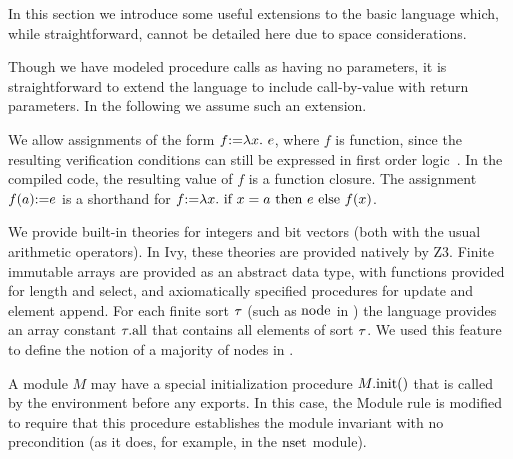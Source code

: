 In this section we introduce some useful extensions to the basic
language which, while straightforward, cannot be detailed here due to
space considerations.

Though we have modeled procedure calls as having no parameters, it is
straightforward to extend the language to include call-by-value with
return parameters. In the following we assume such an extension.

We allow assignments of the form $f \mbox{:=} \lambda x.\ e$, where $f$ is
function, since the resulting verification conditions can still be
expressed in first order logic~\cite{Ivy}. In the compiled code, the
resulting value of $f$ is a function closure.  The assignment $f(a)
\mbox{:=} e$ is a shorthand for $f \mbox{:=} \lambda x.\ \mbox{if $x=a$ then
  $e$ else $f(x)$}$.

We provide built-in theories for integers and bit vectors (both with the usual arithmetic operators). In Ivy, these theories are provided natively
by Z3. Finite immutable
arrays are provided as an abstract data type, with functions provided for length and select,
and axiomatically specified procedures for update and element append. For each finite sort $\tau$ (such as ${\text{node}}$ in \Toy) the
language provides an array constant $\tau.{\text{all}}$ that contains
all elements of sort $\tau$. We used this feature to define the
notion of a majority of nodes in \Toy.

A module $M$ may have a special initialization procedure
$M.{\text{init}}()$ that is called by the environment before any
exports. In this case, the Module rule is modified to require that this procedure establishes the module invariant with no
precondition (as it does, for example, in the ${\text{nset}}$ module).

